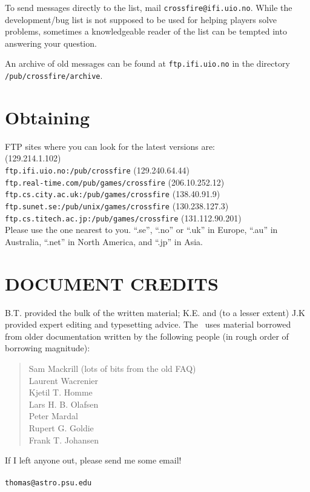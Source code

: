 To send messages directly to the list, mail {\tt crossfire@ifi.uio.no}.
While the development/bug list is not supposed to be used for helping
players solve problems, sometimes a knowledgeable reader of the
list can be tempted into answering your question.

An archive of old messages can be found at {\tt ftp.ifi.uio.no} in the
directory {\tt /pub/crossfire/archive}.

\section{Obtaining \cf } \label{sec:obtain}

FTP sites where you can look for the latest versions are: \\

 (129.214.1.102) \\
{\tt ftp.ifi.uio.no:/pub/crossfire} (129.240.64.44) \\
{\tt ftp.real-time.com/pub/games/crossfire} (206.10.252.12) \\
{\tt ftp.cs.city.ac.uk:/pub/games/crossfire} (138.40.91.9)\\
{\tt ftp.sunet.se:/pub/unix/games/crossfire} (130.238.127.3) \\
{\tt ftp.cs.titech.ac.jp:/pub/games/crossfire} (131.112.90.201) \\

Please use the one nearest to you.  ``.se'', ``.no'' or ``.uk'' in Europe,
``.au'' in Australia, ``.net'' in North America, and ``.jp'' in Asia.

\section{DOCUMENT CREDITS}

B.T. provided the bulk of the written material; K.E. and
(to a lesser extent) J.K provided expert editing and typesetting advice.
The \playbook\ uses material borrowed from older documentation written
by the following people (in rough order of borrowing magnitude):
\begin{quote}
Sam Mackrill (lots of bits from the old FAQ) \\
Laurent Wacrenier \\
Kjetil T. Homme \\
Lars H. B. Olafsen \\
Peter Mardal \\
Rupert G. Goldie \\
Frank T. Johansen
\end{quote}
If I left anyone out, please send me some email! \\

 \\ {\tt thomas@astro.psu.edu} \\
